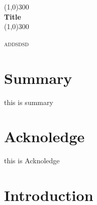 \documentclass{report}
\begin{document}
\begin{titlepage}

	\begin{center}
	
	\line(1,0){300}\\
	[0.25cm]
	\huge{\bfseries Title}\\
	[0.25cm]
	\line(1,0){300}\\
	[10cm]

	\end{center}

	\begin{flushright}
	
	\textsc{\large{addsdsd}}\\	
	
	\end{flushright}


\end{titlepage}


\section*{Summary}
this is summary
\cleardoublepage

\section*{Acknoledge}
this is Acknoledge
\cleardoublepage

\tableofcontents
\thispagestyle{empty}
\cleardoublepage


\listoffigures
{}
\cleardoublepage

\listoftables
{}
\cleardoublepage


\setcounter{page}{1}


\section{Introduction}\label{sec:intro}

\lipsum[1]\

\lipsum[2]\

\lipsum[3]\

\lipsum[4]\

\lipsum[5]\
\end{document}
